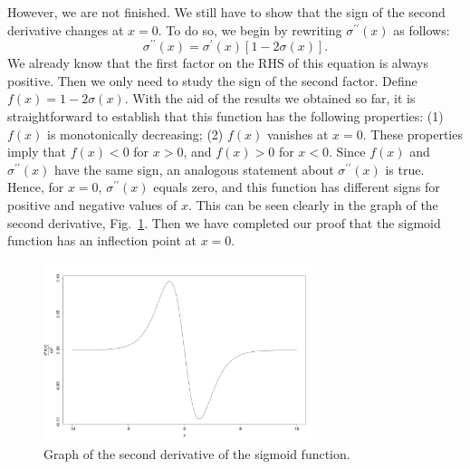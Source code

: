 \documentclass[10pt,american]{scrartcl}
\begin{document}
However, we are not finished. We still have to show that the sign of the second
derivative changes at $x=0$. To do so, we begin by rewriting
$\sigma^{\prime\prime}\left(x\right)$ as follows:
\begin{equation}
\sigma^{\prime\prime}\left(x\right)=\sigma^{\prime}\left(x\right)\left[1-2\sigma\left(x\right)\right].
\label{eq:sigma_sec_der_2}
\end{equation}
We already know that the first factor on the RHS of this equation is always
positive. Then we only need to study the sign of the second factor. Define
$f\left(x\right)=1-2\sigma\left(x\right)$. With the aid of the results we
obtained so far, it is straightforward to establish that this function has the
following properties: (1) $f\left(x\right)$ is monotonically decreasing; (2)
$f\left(x\right)$ vanishes at $x=0$. These properties imply that
$f\left(x\right)<0$ for $x>0$, and $f\left(x\right)>0$ for $x<0$. Since
$f\left(x\right)$ and $\sigma^{\prime\prime}\left(x\right)$ have the same
sign, an analogous statement about $\sigma^{\prime\prime}\left(x\right)$ is
true. Hence, for $x=0$, $\sigma^{\prime\prime}\left(x\right)$ equals zero, and
this function has different signs for positive and negative values of $x$.
This can be seen clearly in the graph of the second derivative,
Fig.~\ref{fig:graph_sec_der_sigma}. Then we have completed our proof that
the sigmoid function has an inflection point at $x=0$.
\begin{figure}[H]
\centering
\includegraphics[width=0.7\textwidth]{../r/second_derivative_sigmoid.png}
\caption{Graph of the second derivative of the sigmoid function.}
\label{fig:graph_sec_der_sigma}
\end{figure}
\end{document}
